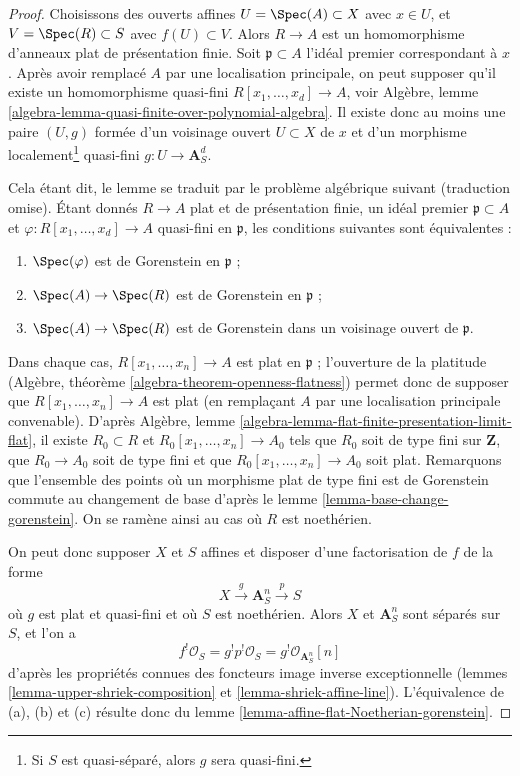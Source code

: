 \begin{proof}
Choisissons des ouverts affines $U = \Spec(A) \subset X$ avec $x \in U$, et $V = \Spec(R) \subset S$ avec $f(U) \subset V$. Alors $R \to A$ est un homomorphisme d'anneaux plat de présentation finie. Soit $\mathfrak p \subset A$ l'idéal premier correspondant à $x$. Après avoir remplacé $A$ par une localisation principale, on peut supposer qu'il existe un homomorphisme quasi-fini $R[x_1, \ldots, x_d]  \to A$, voir Algèbre, lemme \ref{algebra-lemma-quasi-finite-over-polynomial-algebra}. Il existe donc au moins une paire $(U, g)$ formée d'un voisinage ouvert $U \subset X$ de $x$ et d'un morphisme localement\footnote{Si $S$ est quasi-séparé, alors $g$ sera quasi-fini.} quasi-fini $g : U \to \mathbf{A}^d_S$.

\medskip\noindent
Cela étant dit, le lemme se traduit par le problème algébrique suivant (traduction omise). Étant donnés $R \to A$ plat et de présentation finie, un idéal premier $\mathfrak p \subset A$ et $\varphi : R[x_1, \ldots, x_d] \to A$ quasi-fini en $\mathfrak p$, les conditions suivantes sont équivalentes :
\begin{enumerate}
\item[(a)] $\Spec(\varphi)$ est de Gorenstein en $\mathfrak p$ ;
\item[(b)] $\Spec(A) \to \Spec(R)$ est de Gorenstein en $\mathfrak p$ ;
\item[(c)] $\Spec(A) \to \Spec(R)$ est de Gorenstein dans un voisinage ouvert de $\mathfrak p$.
\end{enumerate}
Dans chaque cas, $R[x_1, \ldots, x_n] \to A$ est plat en $\mathfrak p$ ; l'ouverture de la platitude (Algèbre, théorème \ref{algebra-theorem-openness-flatness}) permet donc de supposer que $R[x_1, \ldots, x_n] \to A$ est plat (en remplaçant $A$ par une localisation principale convenable). D'après Algèbre, lemme \ref{algebra-lemma-flat-finite-presentation-limit-flat}, il existe $R_0 \subset R$ et $R_0[x_1, \ldots, x_n] \to A_0$ tels que $R_0$ soit de type fini sur $\mathbf{Z}$, que $R_0 \to A_0$ soit de type fini et que $R_0[x_1, \ldots, x_n] \to A_0$ soit plat. Remarquons que l'ensemble des points où un morphisme plat de type fini est de Gorenstein commute au changement de base d'après le lemme \ref{lemma-base-change-gorenstein}. On se ramène ainsi au cas où $R$ est noethérien.

\medskip\noindent
On peut donc supposer $X$ et $S$ affines et disposer d'une factorisation de $f$ de la forme
$$
X \xrightarrow{g} \mathbf{A}^n_S \xrightarrow{p} S
$$
où $g$ est plat et quasi-fini et où $S$ est noethérien. Alors $X$ et $\mathbf{A}^n_S$ sont séparés sur $S$, et l'on a
$$
f^!\mathcal{O}_S = g^!p^!\mathcal{O}_S = g^!\mathcal{O}_{\mathbf{A}^n_S}[n]
$$
d'après les propriétés connues des foncteurs image inverse exceptionnelle (lemmes \ref{lemma-upper-shriek-composition} et \ref{lemma-shriek-affine-line}). L'équivalence de (a), (b) et (c) résulte donc du lemme \ref{lemma-affine-flat-Noetherian-gorenstein}.
\end{proof}

